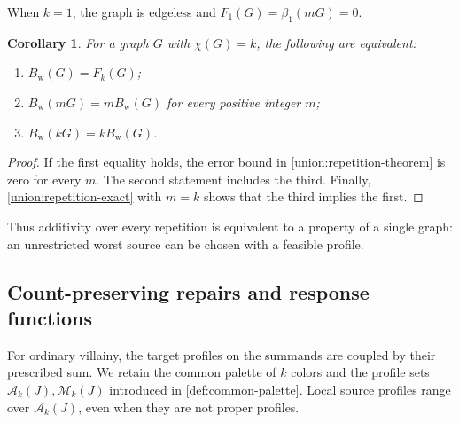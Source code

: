 \documentclass[10pt,a4paper]{amsart}
\numberwithin{equation}{section}
\newtheorem{corollary}[theorem]{Corollary}
\theoremstyle{definition}
\theoremstyle{remark}
\begin{document}
When $k=1$, the graph is edgeless and $F_1(G)=\beta_1(mG)=0$.


\begin{corollary}\label{union:all-repetition-equality}
For a graph $G$ with $\chi(G)=k$, the following are equivalent:
\begin{enumerate}
\item $B_{\mathrm w}(G)=F_k(G)$;
\item $B_{\mathrm w}(mG)=mB_{\mathrm w}(G)$ for every positive integer $m$;
\item $B_{\mathrm w}(kG)=kB_{\mathrm w}(G)$.
\end{enumerate}
\end{corollary}

\begin{proof}
If the first equality holds, the error bound in
\cref{union:repetition-theorem} is zero for every $m$.
The second statement includes the third.  Finally,
\eqref{union:repetition-exact} with $m=k$ shows that the third implies
the first.
\end{proof}

Thus additivity over every repetition is equivalent to a property of
a single graph: an unrestricted worst source can be chosen with a
feasible profile.

\subsection{Count-preserving repairs and response functions}

For ordinary villainy, the target profiles on the summands are coupled
by their prescribed sum. We retain the common palette of $k$ colors
and the profile sets $\mathcal A_k(J),\mathcal M_k(J)$ introduced
in \cref{def:common-palette}. Local source profiles range
over $\mathcal A_k(J)$, even when they are not proper profiles.
\end{document}
